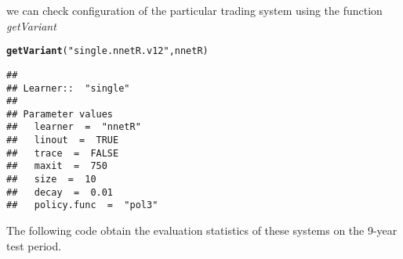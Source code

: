 \documentclass{article}\usepackage[]{graphicx}\usepackage[]{color}
\makeatletter
\newcommand{\hlstr}[1]{\textcolor[rgb]{0.192,0.494,0.8}{#1}}%
\newcommand{\hlstd}[1]{\textcolor[rgb]{0.345,0.345,0.345}{#1}}%
\newcommand{\hlkwd}[1]{\textcolor[rgb]{0.737,0.353,0.396}{\textbf{#1}}}%
\newenvironment{kframe}{%
 \def\at@end@of@kframe{}%
 \ifinner\ifhmode%
  \def\at@end@of@kframe{\end{minipage}}%
  \begin{minipage}{\columnwidth}%
 \fi\fi%
 \def\FrameCommand##1{\hskip\@totalleftmargin \hskip-\fboxsep
 \colorbox{shadecolor}{##1}\hskip-\fboxsep
     \hskip-\linewidth \hskip-\@totalleftmargin \hskip\columnwidth}%
 \MakeFramed {\advance\hsize-\width
   \@totalleftmargin\z@ \linewidth\hsize
   \@setminipage}}%
 {\par\unskip\endMakeFramed%
 \at@end@of@kframe}
\newenvironment{knitrout}{}{} %
\makeatother
\begin{document}
we can check configuration of the particular trading system using the function \textit{getVariant}
\begin{knitrout}
\color{fgcolor}\begin{kframe}
\begin{alltt}
\hlkwd{getVariant}\hlstd{(}\hlstr{"single.nnetR.v12"}\hlstd{, nnetR)}
\end{alltt}
\begin{verbatim}
## 
## Learner::  "single" 
## 
## Parameter values
## 	 learner  =  "nnetR" 
## 	 linout  =  TRUE 
## 	 trace  =  FALSE 
## 	 maxit  =  750 
## 	 size  =  10 
## 	 decay  =  0.01 
## 	 policy.func  =  "pol3"
\end{verbatim}
\end{kframe}
\end{knitrout}
The following code obtain the evaluation statistics of these systems on the 
9-year test period.
\end{document}
